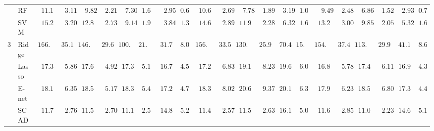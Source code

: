 \begin{tabular}{p{0.2cm}p{1cm}|p{0.6cm}p{0.6cm}|p{0.6cm}p{0.6cm}p{0.6cm}p{0.6cm}p{0.6cm}p{0.6cm}|p{0.6cm}p{0.6cm}p{0.6cm}p{0.6cm}p{0.6cm}p{0.6cm}|p{0.6cm}p{0.6cm}p{0.6cm}p{0.6cm}p{0.6cm}p{0.6cm}}
 & RF  & $\phantom{0}11.11$ & $\phantom{00}3.11$ & $\phantom{00}9.82$ & $\phantom{00}2.21$ & $\phantom{00}7.30$ & $\phantom{0}1.67$ & $\phantom{00}2.95$ & $\phantom{0}0.65$ & $\phantom{0}10.62$ & $\phantom{00}2.69$ & $\phantom{00}7.78$ & $\phantom{00}1.89$ & $\phantom{00}3.19$ & $\phantom{0}1.00$ & $\phantom{00}9.49$ & $\phantom{00}2.48$ & $\phantom{00}6.86$ & $\phantom{00}1.52$ & $\phantom{00}2.93$ & $\phantom{0}0.74$ \\
 & SVM  & $\phantom{0}15.26$ & $\phantom{00}3.20$ & $\phantom{0}12.86$ & $\phantom{00}2.73$ & $\phantom{00}9.14$ & $\phantom{0}1.97$ & $\phantom{00}3.84$ & $\phantom{0}1.37$ & $\phantom{0}14.69$ & $\phantom{00}2.89$ & $\phantom{0}11.91$ & $\phantom{00}2.28$ & $\phantom{00}6.32$ & $\phantom{0}1.63$ & $\phantom{0}13.25$ & $\phantom{00}3.00$ & $\phantom{00}9.85$ & $\phantom{00}2.05$ & $\phantom{00}5.32$ & $\phantom{0}1.63$ \\\hline
3 & Ridge  & $166.58$ & $\phantom{0}35.12$ & $146.49$ & $\phantom{0}29.65$ & $100.52$ & $21.75$ & $\phantom{0}31.74$ & $\phantom{0}8.08$ & $156.80$ & $\phantom{0}33.54$ & $130.27$ & $\phantom{0}25.90$ & $\phantom{0}70.46$ & $15.25$ & $154.31$ & $\phantom{0}37.41$ & $113.86$ & $\phantom{0}29.99$ & $\phantom{0}41.15$ & $\phantom{0}8.65$ \\
 & Lasso  & $\phantom{0}17.31$ & $\phantom{00}5.86$ & $\phantom{0}17.67$ & $\phantom{00}4.92$ & $\phantom{0}17.37$ & $\phantom{0}5.17$ & $\phantom{0}16.77$ & $\phantom{0}4.56$ & $\phantom{0}17.25$ & $\phantom{00}6.83$ & $\phantom{0}19.15$ & $\phantom{00}8.23$ & $\phantom{0}19.61$ & $\phantom{0}6.05$ & $\phantom{0}16.89$ & $\phantom{00}5.78$ & $\phantom{0}17.43$ & $\phantom{00}6.11$ & $\phantom{0}16.92$ & $\phantom{0}4.39$ \\
 & E-net  & $\phantom{0}18.12$ & $\phantom{00}6.35$ & $\phantom{0}18.58$ & $\phantom{00}5.17$ & $\phantom{0}18.34$ & $\phantom{0}5.48$ & $\phantom{0}17.22$ & $\phantom{0}4.76$ & $\phantom{0}18.31$ & $\phantom{00}8.02$ & $\phantom{0}20.67$ & $\phantom{00}9.37$ & $\phantom{0}20.14$ & $\phantom{0}6.39$ & $\phantom{0}17.95$ & $\phantom{00}6.23$ & $\phantom{0}18.54$ & $\phantom{00}6.80$ & $\phantom{0}17.39$ & $\phantom{0}4.40$ \\
 & SCAD  & $\phantom{0}11.72$ & $\phantom{00}2.76$ & $\phantom{0}11.51$ & $\phantom{00}2.70$ & $\phantom{0}11.18$ & $\phantom{0}2.59$ & $\phantom{0}14.86$ & $\phantom{0}5.24$ & $\phantom{0}11.49$ & $\phantom{00}2.57$ & $\phantom{0}11.56$ & $\phantom{00}2.63$ & $\phantom{0}16.15$ & $\phantom{0}5.04$ & $\phantom{0}11.62$ & $\phantom{00}2.85$ & $\phantom{0}11.04$ & $\phantom{00}2.23$ & $\phantom{0}14.61$ & $\phantom{0}5.16$ \\

\end{tabular}
